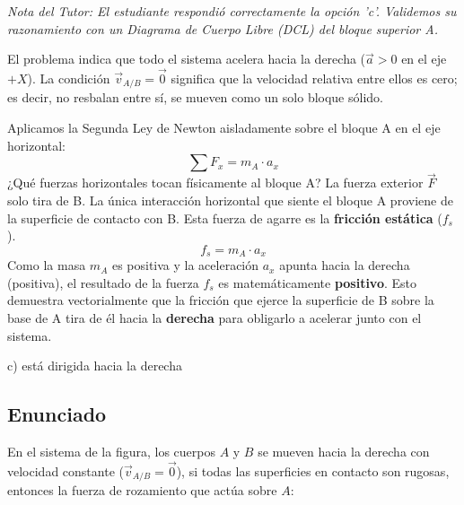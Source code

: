 \documentclass[12pt, a4paper]{article}
\begin{document}
\textit{Nota del Tutor: El estudiante respondió correctamente la opción 'c'. Validemos su razonamiento con un Diagrama de Cuerpo Libre (DCL) del bloque superior A.}

El problema indica que todo el sistema acelera hacia la derecha ($\vec{a} > 0$ en el eje $+X$). La condición $\vec{v}_{A/B} = \vec{0}$ significa que la velocidad relativa entre ellos es cero; es decir, no resbalan entre sí, se mueven como un solo bloque sólido.

Aplicamos la Segunda Ley de Newton aisladamente sobre el bloque A en el eje horizontal:
$$ \sum F_x = m_A \cdot a_x $$
¿Qué fuerzas horizontales tocan físicamente al bloque A? La fuerza exterior $\vec{F}$ solo tira de B. La única interacción horizontal que siente el bloque A proviene de la superficie de contacto con B. Esta fuerza de agarre es la \textbf{fricción estática} ($f_s$).
$$ f_s = m_A \cdot a_x $$
Como la masa $m_A$ es positiva y la aceleración $a_x$ apunta hacia la derecha (positiva), el resultado de la fuerza $f_s$ es matemáticamente \textbf{positivo}. Esto demuestra vectorialmente que la fricción que ejerce la superficie de B sobre la base de A tira de él hacia la \textbf{derecha} para obligarlo a acelerar junto con el sistema.

\begin{tcolorbox}[colback=green!5!white, colframe=green!50!black, title=Respuesta Final]
\centering \Large c) está dirigida hacia la derecha
\end{tcolorbox}

\newpage

\subsection*{Enunciado}
En el sistema de la figura, los cuerpos $A$ y $B$ se mueven hacia la derecha con velocidad constante ($\vec{v}_{A/B} = \vec{0}$), si todas las superficies en contacto son rugosas, entonces la fuerza de rozamiento que actúa sobre $A$:

\begin{center}
\end{center}
\end{document}
